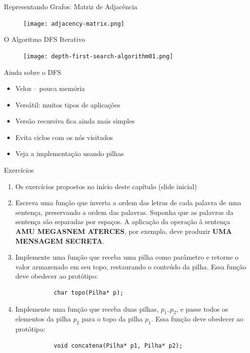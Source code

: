 \begin{frame}[c]{Representando Grafos: Matriz de Adjacência} 

		   	\begin{figure}[!htpb]
				\centering
				\texttt{[image: adjacency-matrix.png]}
			\end{figure} 
\end{frame}


\begin{frame}[c]{O Algoritmo DFS Iterativo} 

		   	\begin{figure}[!htpb]
				\centering
				\texttt{[image: depth-first-search-algorithm01.png]}
			\end{figure} 
\end{frame}


\begin{frame}[c]{Ainda sobre o DFS} 

\begin{itemize}
  \item Veloz -- pouca memória
  \item Versátil: muitos tipos de aplicações
  \item Versão recursiva fica ainda mais simples
  \item Evita ciclos com os nós visitados 
  \item Veja a implementação usando pilhas
  
\end{itemize}

\end{frame}



\begin{frame}[fragile]{Exercícios}
	\begin{enumerate}
	
	\item Os exercícios propostos no início deste capítulo (slide inicial)
	
	
		\item Escreva uma função que inverta a ordem das letras de cada palavra de uma sentença, preservando a ordem das palavras. Suponha que as palavras da sentença são separadas por espaços. A aplicação da operação à sentença \textbf{AMU MEGASNEM ATERCES}, por exemplo, deve produzir \textbf{UMA MENSAGEM SECRETA}.
		\item Implemente uma função que receba uma pilha como parâmetro e retorne o valor armazenado em seu topo, restaurando o conteúdo da pilha. Essa função deve obedecer ao protótipo: 
		\begin{verbatim}
		   char topo(Pilha* p);
		\end{verbatim} 
		\item Implemente uma função que receba duas pilhas, $p_1, p_2$, e passe todos os elementos da pilha $p_2$ para o topo da pilha $p_1$. Essa função deve obedecer ao protótipo: 
		\begin{verbatim}
		   void concatena(Pilha* p1, Pilha* p2);
		\end{verbatim} 
	\end{enumerate}
\end{frame}
